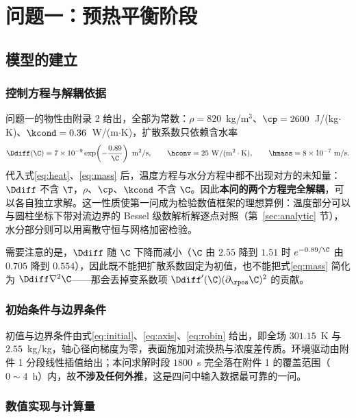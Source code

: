 \section{问题一：预热平衡阶段}
\label{sec:q1}

\subsection{模型的建立}

\subsubsection{控制方程与解耦依据}

问题一的物性由附录 2 给出，全部为常数：$\rho=820$~kg/m$^3$、$\cp=2600$~J/(kg$\cdot$K)、$\kcond=0.36$~W/(m$\cdot$K)，扩散系数只依赖含水率
\begin{equation}
\Ddiff(\C)=7\times10^{-9}\exp\!\left(-\frac{0.89}{\C}\right)~\mathrm{m^2/s},
\qquad \hconv=25~\mathrm{W/(m^2\cdot K)},\qquad \hmass=8\times10^{-7}~\mathrm{m/s}.
\label{eq:app2}
\end{equation}
代入式\eqref{eq:heat}、\eqref{eq:mass} 后，温度方程与水分方程中都不出现对方的未知量：$\Ddiff$ 不含 $\T$，$\rho$、$\cp$、$\kcond$ 不含 $\C$。因此\textbf{本问的两个方程完全解耦}，可以各自独立求解。这一性质使第一问成为检验数值框架的理想算例：温度部分可以与圆柱坐标下带对流边界的 Bessel 级数解析解逐点对照（第~\ref{sec:analytic} 节），水分部分则可以用离散守恒与网格加密检验。

需要注意的是，$\Ddiff$ 随 $\C$ 下降而减小（$\C$ 由 $2.55$ 降到 $1.51$ 时 $e^{-0.89/\C}$ 由 $0.705$ 降到 $0.554$），因此既不能把扩散系数固定为初值，也不能把式\eqref{eq:mass} 简化为 $\Ddiff\nabla^2\C$——那会丢掉变系数项 $\Ddiff'(\C)(\partial_\rpos\C)^2$ 的贡献。

\subsubsection{初始条件与边界条件}

初值与边界条件由式\eqref{eq:initial}、\eqref{eq:axis}、\eqref{eq:robin} 给出，即全场 $301.15$~K 与 $2.55$~kg/kg，轴心径向梯度为零，表面施加对流换热与浓度差传质。环境驱动由附件 1 分段线性插值给出；本问求解时段 $1800$~s 完全落在附件 1 的覆盖范围（$0\sim4$~h）内，故\textbf{不涉及任何外推}，这是四问中输入数据最可靠的一问。

\subsubsection{数值实现与计算量}

